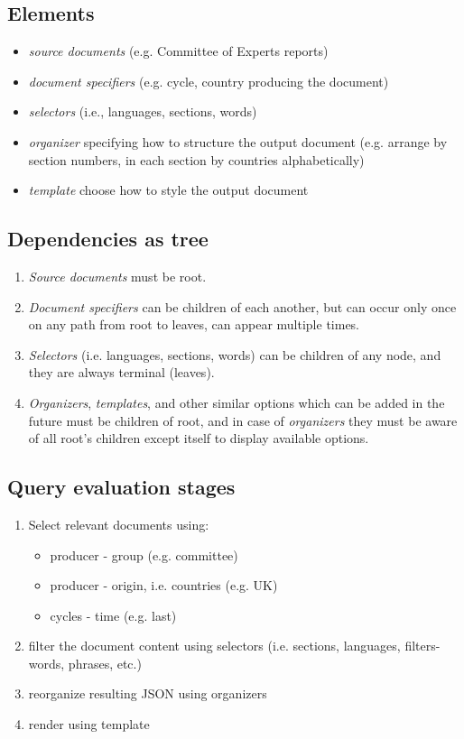 \documentclass{tufte-book}
\begin{document}
\subsection{Elements}
\begin{itemize}
  \item \emph{source documents} (e.g. Committee of Experts reports)
  \item \emph{document specifiers} (e.g. cycle, country producing the document)
  \item \emph{selectors} (i.e., languages, sections, words)
  \item \emph{organizer} specifying how to structure the output document (e.g. arrange by section numbers, in each section by countries alphabetically)
  \item \emph{template} choose how to style the output document
\end{itemize}

\subsection{Dependencies as tree}
\begin{enumerate}
  \item \emph{Source documents} must be root.
  \item \emph{Document specifiers} can be children of each another, but can occur only once on any path from root to leaves, can appear multiple times.
  \item \emph{Selectors} (i.e. languages, sections, words) can be children of any node, and they are always terminal (leaves).
  \item \emph{Organizers}, \emph{templates}, and other similar options which can be added in the future must be children of root, and in case of \emph{organizers} they must be aware of all root's children except itself to display available options.
\end{enumerate}

\subsection{Query evaluation stages}
\begin{enumerate}
  \item Select relevant documents using:
  \begin{itemize}
    \item producer - group (e.g. committee)
    \item producer - origin, i.e. countries (e.g. UK)
    \item cycles - time (e.g. last)
  \end{itemize}
  \item filter the document content using selectors (i.e. sections, languages, filters- words, phrases, etc.)
  \item reorganize resulting JSON using organizers
  \item render using template
\end{enumerate}
\end{document}
